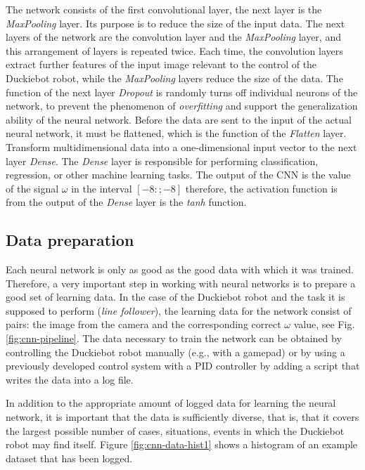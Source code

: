 \documentclass[conference]{IEEEtran}
\begin{document}
The network consists of the first convolutional layer, the next layer is the \emph{MaxPooling} layer. Its purpose is to reduce the size of the input data. The next layers of the network are the convolution layer and the \emph{MaxPooling} layer, and this arrangement of layers is repeated twice. Each time, the convolution layers extract further features of the input image relevant to the control of the Duckiebot robot, while the \emph{MaxPooling} layers reduce the size of the data. The function of the next layer \emph{Dropout} is randomly turns off individual neurons of the network, to prevent the phenomenon of \emph{overfitting} and support the generalization ability of the neural network. Before the data are sent to the input of the actual neural network, it must be flattened, which is the function of the \emph{Flatten} layer. Transform multidimensional data into a one-dimensional input vector to the next layer \emph{Dense}. The \emph{Dense} layer is responsible for performing classification, regression, or other machine learning tasks. The output of the CNN is the value of the signal $\omega$ in the interval $[-8: ; -8]$ therefore, the activation function is from the output of the \emph{Dense} layer is the \emph{tanh} function.

\subsection{Data preparation}
Each neural network is only as good as the good data with which it was trained. Therefore, a very important step in working with neural networks is to prepare a good set of learning data. In the case of the Duckiebot robot and the task it is supposed to perform (\emph{line follower}), the learning data for the network consist of pairs: the image from the camera and the corresponding correct $\omega$ value, see Fig. \ref{fig:cnn-pipeline}. The data necessary to train the network can be obtained by controlling the Duckiebot robot manually (e.g., with a gamepad) or by using a previously developed control system with a PID controller by adding a script that writes the data into a log file. 

In addition to the appropriate amount of logged data for learning the neural network, it is important that the data is sufficiently diverse, that is, that it covers the largest possible number of cases, situations, events in which the Duckiebot robot may find itself. Figure \ref{fig:cnn-data-hist1} shows a histogram of an example dataset that has been logged. 
\end{document}
